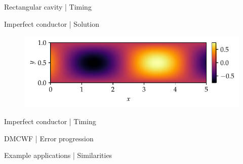\documentclass{beamer}
\begin{document}
\begin{frame}{Rectangular cavity | Timing}
    \begin{table}
        \centering
        \scalebox{0.8}{}
    \end{table}
\end{frame}

\begin{frame}{Imperfect conductor | Solution}
    \begin{figure}
        \centering
        \includegraphics[scale=0.8]{../report/plots/imperfect_conductor_solution.pdf}
    \end{figure}
\end{frame}

\begin{frame}{Imperfect conductor | Timing}
    \begin{table}
        \centering
        \scalebox{0.8}{}
    \end{table}
\end{frame}

\begin{frame}{DMCWF | Error progression}
    \begin{figure}
        \centering
        \scalebox{0.6}{}
    \end{figure}
\end{frame}

\begin{frame}{Example applications | Similarities}
    \begin{figure}
        \centering
        \scalebox{0.8}{}
    \end{figure}
\end{frame}
\end{document}
